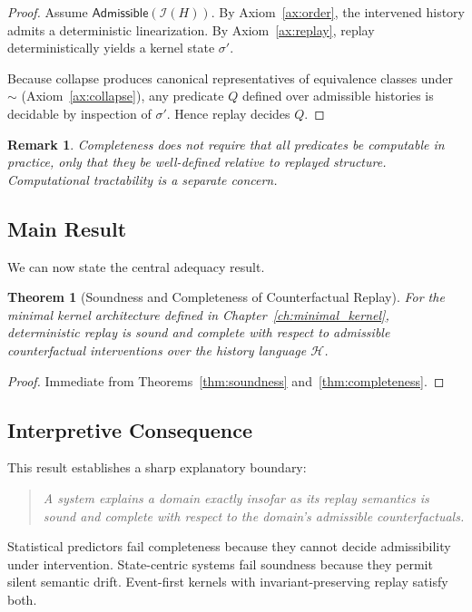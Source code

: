 \documentclass[11pt]{article}
\newtheorem{remark}{Remark}
\newtheorem{theorem}{Theorem}
\begin{document}
\begin{proof}
Assume $\mathsf{Admissible}(\mathcal{I}(H))$. By Axiom~\ref{ax:order}, the intervened history admits a deterministic linearization. By Axiom~\ref{ax:replay}, replay deterministically yields a kernel state $\sigma'$.

Because collapse produces canonical representatives of equivalence classes under $\sim$ (Axiom~\ref{ax:collapse}), any predicate $Q$ defined over admissible histories is decidable by inspection of $\sigma'$. Hence replay decides $Q$.
\end{proof}

\begin{remark}
Completeness does not require that all predicates be computable in practice, only that they be well-defined relative to replayed structure. Computational tractability is a separate concern.
\end{remark}

\subsection{Main Result}

We can now state the central adequacy result.

\begin{theorem}[Soundness and Completeness of Counterfactual Replay]
\label{thm:sc_main}
For the minimal kernel architecture defined in Chapter~\ref{ch:minimal_kernel}, deterministic replay is sound and complete with respect to admissible counterfactual interventions over the history language $\mathcal{H}$.
\end{theorem}

\begin{proof}
Immediate from Theorems~\ref{thm:soundness} and~\ref{thm:completeness}.
\end{proof}

\subsection{Interpretive Consequence}

This result establishes a sharp explanatory boundary:

\begin{quote}
\emph{A system explains a domain exactly insofar as its replay semantics is sound and complete with respect to the domain’s admissible counterfactuals.}
\end{quote}

Statistical predictors fail completeness because they cannot decide admissibility under intervention. State-centric systems fail soundness because they permit silent semantic drift. Event-first kernels with invariant-preserving replay satisfy both.
\end{document}
